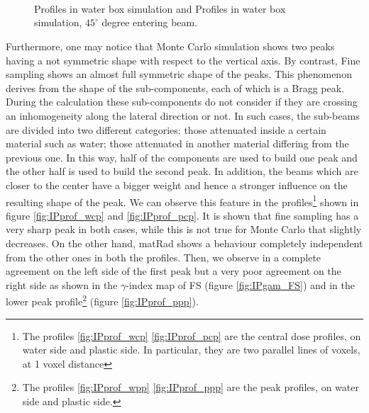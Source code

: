 \documentclass[12pt, a4paper, twoside]{book}
\begin{document}
\begin{figure}[]
\centering
{} 
\\
\\
\\
\caption{Profiles in water box simulation and Profiles in water box simulation,  $45^\circ$ degree entering beam.}
\label{fig:IPprof}
\end{figure}

Furthermore, one may notice that Monte Carlo simulation shows two peaks having a not symmetric shape with respect to the vertical axis. By contrast, Fine sampling shows an almost full symmetric shape of the peaks. This phenomenon derives from the shape of the sub-components, each of which is a Bragg peak. During the calculation these sub-components do not consider if they are crossing an inhomogeneity along the lateral direction or not. 
In such cases, the sub-beams are divided into two different categories: those attenuated inside a certain material such as water; those attenuated in another material differing from the previous one.
In this way, half of the components are used to build one peak and the other half is used to build the second peak. In addition, the beams which are closer to the center have a bigger weight and hence a stronger influence on the resulting shape of the peak. We can observe this feature in the profiles\footnote{The profiles \ref{fig:IPprof_wcp} \ref{fig:IPprof_pcp} are the central dose profiles, on water side and plastic side. In particular, they are two parallel lines of voxels, at 1 voxel distance} shown in figure \ref{fig:IPprof_wcp} and \ref{fig:IPprof_pcp}. It is shown that fine sampling has a very sharp peak in both cases, while this is not true for Monte Carlo that slightly decreases. On the other hand, matRad shows a behaviour completely independent from the other ones in both the profiles.
Then, we observe in a complete agreement on the left side of the first peak but a very poor agreement on the right side as shown in the $\gamma$-index map of FS (figure \ref{fig:IPgam_FS}) and in the lower peak profile\footnote{The profiles \ref{fig:IPprof_wpp} \ref{fig:IPprof_ppp} are the peak profiles, on water side and plastic side.} (figure \ref{fig:IPprof_ppp}).
\end{document}
